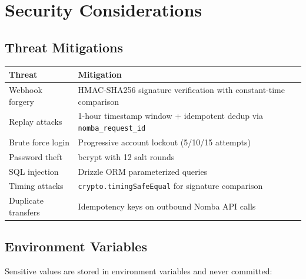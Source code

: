 \documentclass[11pt,a4paper]{article}
\begin{document}
\section{Security Considerations}

\subsection{Threat Mitigations}

\begin{table}[h]
  \centering
  \small
  \begin{tabular}{lp{7cm}}
    \toprule
    Threat & Mitigation \\
    \midrule
    Webhook forgery     & HMAC-SHA256 signature verification with
                          constant-time comparison \\
    Replay attacks      & 1-hour timestamp window + idempotent dedup via
                          \texttt{nomba\_request\_id} \\
    Brute force login   & Progressive account lockout (5/10/15 attempts) \\
    Password theft      & bcrypt with 12 salt rounds \\
    SQL injection       & Drizzle ORM parameterized queries \\
    Timing attacks      & \texttt{crypto.timingSafeEqual} for signature
                          comparison \\
    Duplicate transfers & Idempotency keys on outbound Nomba API calls \\
    \bottomrule
  \end{tabular}
\end{table}

\subsection{Environment Variables}

Sensitive values are stored in environment variables and never committed:
\end{document}

